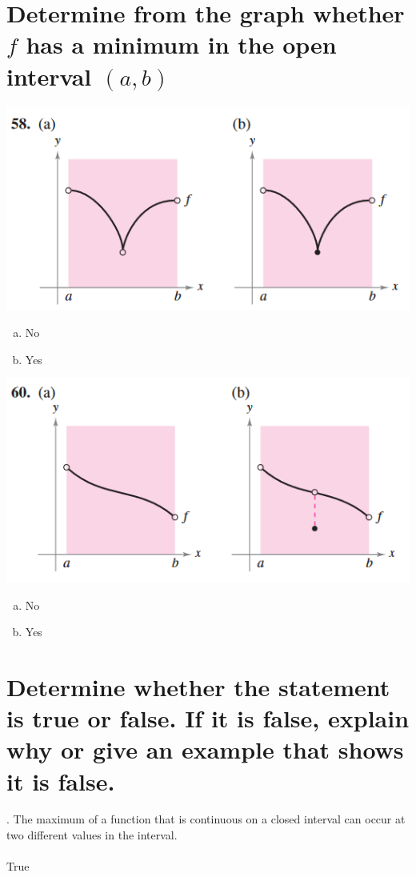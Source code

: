 \documentclass[11pt]{article}
\begin{document}
\section{Determine from the graph whether $f$ has a minimum in the open interval $(a, b)$}
\includegraphics{58.png}
\begin{enumerate}[(a)]
    \item No
    \item Yes 
\end{enumerate}

\vspace{1cm}
\noindent
\includegraphics{60.png}
\begin{enumerate}[(a)]
    \item No
    \item Yes 
\end{enumerate}

\section{Determine whether the statement is true or false. If it is false, explain why or give an example that shows it is false.}
. The maximum of a function that is continuous on a closed interval can occur at two different values in the interval.\\
\\
\indent True
\end{document}
